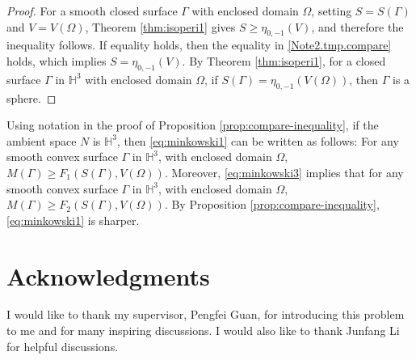 \documentclass[11pt]{amsart}
\theoremstyle{definition}
\newcommand{\HH}{\mathbb{H}}
\theoremstyle{remark}
\numberwithin{equation}{section}
\begin{document}
\begin{proof}
			For a smooth closed surface \(\Gamma\) with enclosed domain $\Omega$, setting \(S=S(\Gamma)\) and \(V=V(\Omega)\), Theorem \ref{thm:isoperi1} gives $S \geq \eta_{0,-1}(V)$, and therefore the inequality follows.
			If equality holds, then the equality in \eqref{Note2.tmp.compare} holds, which implies $S = \eta_{0,-1}(V)$. By Theorem \ref{thm:isoperi1}, for a closed surface $\Gamma$ in $\HH^3$ with enclosed domain $\Omega$, if $S(\Gamma) = \eta_{0,-1}(V(\Omega))$, then $\Gamma$ is a sphere.
		\end{proof}
		
		Using notation in the proof of Proposition \ref{prop:compare-inequality}, if the ambient space $N$ is $\HH^3$, then \eqref{eq:minkowski1} can be written as follows: For any smooth convex surface $\Gamma$ in $\HH^3$, with enclosed domain $\Omega$,
		$
		M(\Gamma) \geq F_1(S(\Gamma), V(\Omega)).
		$
		Moreover, \eqref{eq:minkowski3} implies that for any smooth convex surface $\Gamma$ in $\HH^3$, with enclosed domain $\Omega$,
		$
		M(\Gamma) \geq F_2(S(\Gamma), V(\Omega)).
		$
		By Proposition \ref{prop:compare-inequality}, \eqref{eq:minkowski1} is sharper.
	
	
	\section*{Acknowledgments}
	I would like to thank my supervisor, Pengfei Guan, for introducing this problem to me and for many inspiring discussions. I would also like to thank Junfang Li for helpful discussions.
	
\end{document}
